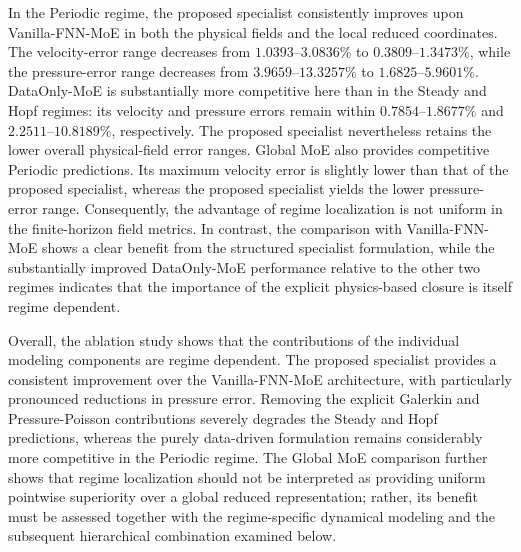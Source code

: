 In the Periodic regime, the proposed specialist consistently improves upon
Vanilla-FNN-MoE in both the physical fields and the local reduced
coordinates. The velocity-error range decreases from
$1.0393$--$3.0836\%$ to $0.3809$--$1.3473\%$, while the pressure-error
range decreases from $3.9659$--$13.3257\%$ to
$1.6825$--$5.9601\%$. DataOnly-MoE is substantially more competitive here
than in the Steady and Hopf regimes: its velocity and pressure errors remain
within $0.7854$--$1.8677\%$ and $2.2511$--$10.8189\%$, respectively.
The proposed specialist nevertheless retains the lower overall physical-field
error ranges. Global MoE also provides competitive Periodic predictions. Its maximum
velocity error is slightly lower than that of the proposed specialist,
whereas the proposed specialist yields the lower pressure-error range.
Consequently, the advantage of regime localization is not uniform in the
finite-horizon field metrics. In contrast, the comparison with
Vanilla-FNN-MoE shows a clear benefit from the structured specialist
formulation, while the substantially improved DataOnly-MoE performance
relative to the other two regimes indicates that the importance of the
explicit physics-based closure is itself regime dependent.

Overall, the ablation study shows that the contributions of the individual
modeling components are regime dependent. The proposed specialist provides
a consistent improvement over the Vanilla-FNN-MoE architecture, with
particularly pronounced reductions in pressure error. Removing the explicit
Galerkin and Pressure-Poisson contributions severely degrades the Steady
and Hopf predictions, whereas the purely data-driven formulation remains
considerably more competitive in the Periodic regime. The Global MoE
comparison further shows that regime localization should not be interpreted
as providing uniform pointwise superiority over a global reduced
representation; rather, its benefit must be assessed together with the
regime-specific dynamical modeling and the subsequent hierarchical
combination examined below.



